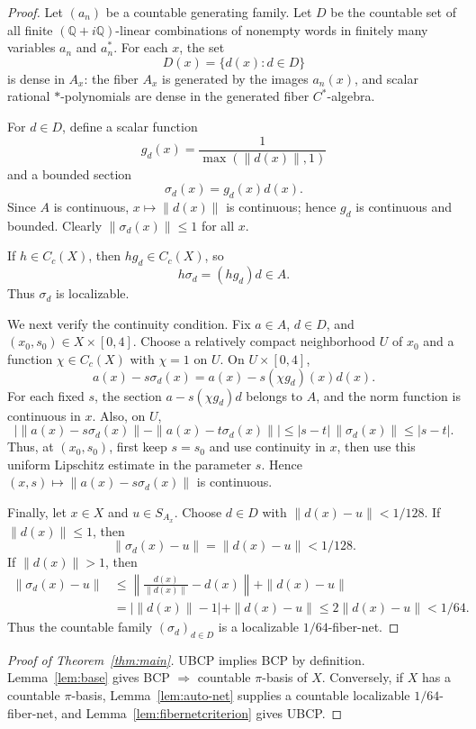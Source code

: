 \documentclass[11pt]{article}
\begin{document}
\begin{proof}
Let \((a_n)\) be a countable generating family.  Let \(D\) be the countable set
of all finite \((\mathbb Q+i\mathbb Q)\)-linear combinations of nonempty words
in finitely many variables \(a_n\) and \(a_n^*\).  For each \(x\), the set
\[
        D(x)=\{d(x):d\in D\}
\]
is dense in \(A_x\): the fiber \(A_x\) is generated by the images \(a_n(x)\),
and scalar rational \(*\)-polynomials are dense in the generated fiber
\(C^*\)-algebra.

For \(d\in D\), define a scalar function
\[
        g_d(x)=\frac{1}{\max(\|d(x)\|,1)}
\]
and a bounded section
\[
        \sigma_d(x)=g_d(x)d(x).
\]
Since \(A\) is continuous, \(x\mapsto\|d(x)\|\) is continuous; hence \(g_d\) is
continuous and bounded.  Clearly \(\|\sigma_d(x)\|\le1\) for all \(x\).

If \(h\in C_c(X)\), then \(hg_d\in C_c(X)\), so
\[
        h\sigma_d=(hg_d)d\in A.
\]
Thus \(\sigma_d\) is localizable.

We next verify the continuity condition.  Fix \(a\in A\), \(d\in D\), and
\((x_0,s_0)\in X\times[0,4]\).  Choose a relatively compact neighborhood
\(U\) of \(x_0\) and a function \(\chi\in C_c(X)\) with \(\chi=1\) on \(U\).
On \(U\times[0,4]\),
\[
        a(x)-s\sigma_d(x)
        =
        a(x)-s(\chi g_d)(x)d(x).
\]
For each fixed \(s\), the section \(a-s(\chi g_d)d\) belongs to \(A\), and the
norm function is continuous in \(x\).  Also, on \(U\),
\[
 \bigl|\|a(x)-s\sigma_d(x)\|-\|a(x)-t\sigma_d(x)\|\bigr|
 \le |s-t|\,\|\sigma_d(x)\|
 \le |s-t|.
\]
Thus, at \((x_0,s_0)\), first keep \(s=s_0\) and use continuity in \(x\), then
use this uniform Lipschitz estimate in the parameter \(s\).  Hence
\((x,s)\mapsto\|a(x)-s\sigma_d(x)\|\) is continuous.

Finally, let \(x\in X\) and \(u\in S_{A_x}\).  Choose \(d\in D\) with
\(\|d(x)-u\|<1/128\).  If \(\|d(x)\|\le1\), then
\[
        \|\sigma_d(x)-u\|=\|d(x)-u\|<1/128.
\]
If \(\|d(x)\|>1\), then
\[
\begin{aligned}
        \|\sigma_d(x)-u\|
        &\le
        \left\|\frac{d(x)}{\|d(x)\|}-d(x)\right\|+\|d(x)-u\|\\
        &=
        |\|d(x)\|-1|+\|d(x)-u\|
        \le 2\|d(x)-u\|
        <1/64.
\end{aligned}
\]
Thus the countable family \((\sigma_d)_{d\in D}\) is a localizable
\(1/64\)-fiber-net.
\end{proof}

\begin{proof}[Proof of Theorem~\ref{thm:main}]
UBCP implies BCP by definition.  Lemma~\ref{lem:base} gives BCP
\(\Rightarrow\) countable \(\pi\)-basis of \(X\).  Conversely, if \(X\) has a
countable \(\pi\)-basis, Lemma~\ref{lem:auto-net} supplies a countable
localizable \(1/64\)-fiber-net, and Lemma~\ref{lem:fibernetcriterion} gives
UBCP.
\end{proof}
\end{document}
